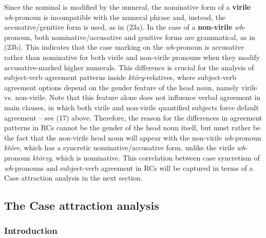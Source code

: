 \documentclass[output=paper]{langsci/langscibook}
\begin{document}
Since the nominal is modified by the numeral, the nominative form of a \textbf{virile} \textit{wh}{}-pronoun is incompatible with the numeral phrase and, instead, the accusative\slash genitive form is used, as in (23a). In the case of a \textbf{non-virile} \textit{wh}{}-pronoun, both nominative\slash accusative and genitive forms are grammatical, as in (23b). This indicates that the case marking on the \textit{wh}{}-pronoun is accusative rather than nominative for both virile and non-virile pronouns when they modify accusative-marked higher numerals. This difference is crucial for the analysis of subject-verb agreement patterns inside \textit{który}{}-relatives, where subject-verb agreement options depend on the gender feature of the head noun, namely virile vs. non-virile. Note that this feature alone does not influence verbal agreement in main clauses, in which both virile and non-virile quantified subjects force default agreement – see (17) above. Therefore, the reason for the differences in agreement patterns in RCs cannot be the gender of the head noun itself, but must rather be the fact that the non-virile head noun will appear with the non-virile \textit{wh}{}-pronoun \textit{które}, which has a syncretic nominative/accusative form, unlike the virile \textit{wh}{}-pronoun \textit{którzy}, which is nominative. This correlation between case syncretism of \textit{wh}{}-pronouns and subject-verb agreement in RCs will be captured in terms of a Case attraction analysis in the next section.

\subsection{The Case attraction analysis}%
\subsubsection{Introduction}
\end{document}
